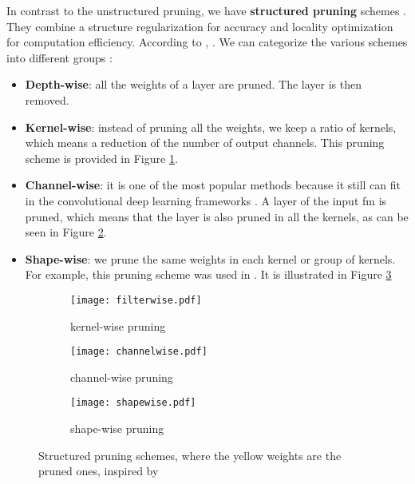 In contrast to the unstructured pruning, we have \textbf{structured pruning} schemes \cite{kang_accelerator-aware_2020}. They combine a structure regularization for accuracy and locality optimization for computation efficiency. According to \textcite{anwar_structured_2017}, . We can categorize the various schemes into different groups \cite{cheng_recent_2018, kang_accelerator-aware_2020, anwar_structured_2017, wen_learning_2016}:
\begin{itemize}
    \item \textbf{Depth-wise}: all the weights of a layer are pruned. The layer is then removed.
    \item \textbf{Kernel-wise}: instead of pruning all the weights, we keep a ratio of kernels, which means a reduction of the number of output channels. This pruning scheme is provided in Figure \ref{fig:struct_pruning:fw}.
    \item \textbf{Channel-wise}: it is one of the most popular methods because it still can fit in the convolutional deep learning frameworks \cite{liu_rethinking_2019}. A layer of the input \acrshort{fm} is pruned, which means that the layer is also pruned in all the kernels, as can be seen in Figure \ref{fig:struct_pruning:chw}.
    \item \textbf{Shape-wise}: we prune the same weights in each kernel or group of kernels. For example, this pruning scheme was used in \textcite{zhu_efficient_2020}. It is illustrated in Figure \ref{fig:struct_pruning:sw}
\end{itemize}
%
\begin{figure}[H]
    \centering
    \begin{subfigure}[t]{.32\textwidth}
    \centering
    \texttt{[image: filterwise.pdf]}
    \caption{kernel-wise pruning}
    \label{fig:struct_pruning:fw}
    \end{subfigure}
    \begin{subfigure}[t]{.32\textwidth}
    \centering
    \texttt{[image: channelwise.pdf]}
    \caption{channel-wise pruning}
    \label{fig:struct_pruning:chw}
    \end{subfigure}
    \begin{subfigure}[t]{.32\textwidth}
    \centering
    \texttt{[image: shapewise.pdf]}
    \caption{shape-wise pruning}
    \label{fig:struct_pruning:sw}
    \end{subfigure}
    \caption{Structured pruning schemes, where the yellow weights are the pruned ones, inspired by \cite{cheng_recent_2018}}
    \label{fig:struct_pruning}
\end{figure}
